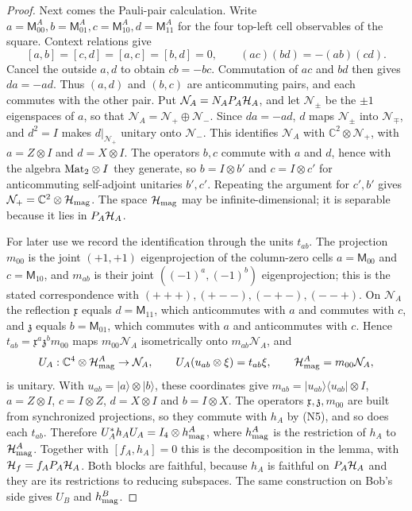 \begin{proof}
Next comes the Pauli-pair calculation. Write $a=\mathsf M^A_{00},b=\mathsf M^A_{01},c=\mathsf M^A_{10},d=\mathsf M^A_{11}$ for the four top-left cell observables of the square. Context relations give
\[
 [a,b]=[c,d]=[a,c]=[b,d]=0,\qquad
 (ac)(bd)=-(ab)(cd).
\]
Cancel the outside $a,d$ to obtain $cb=-bc$. Commutation of $ac$ and $bd$ then gives $da=-ad$. Thus $(a,d)$ and $(b,c)$ are anticommuting pairs, and each commutes with the other pair. Put $\mathcal N_A=N_AP_A\mathcal H_A$, and let $\mathcal N_\pm$ be the $\pm1$ eigenspaces of $a$, so that $\mathcal N_A=\mathcal N_+\oplus\mathcal N_-$. Since $da=-ad$, $d$ maps $\mathcal N_\pm$ into $\mathcal N_\mp$, and $d^2=I$ makes $d|_{\mathcal N_+}$ unitary onto $\mathcal N_-$. This identifies $\mathcal N_A$ with $\mathbb C^2\otimes\mathcal N_+$, with $a=Z\otimes I$ and $d=X\otimes I$. The operators $b,c$ commute with $a$ and $d$, hence with the algebra $\mathrm{Mat}_2\otimes I$ they generate, so $b=I\otimes b'$ and $c=I\otimes c'$ for anticommuting self-adjoint unitaries $b',c'$. Repeating the argument for $c',b'$ gives $\mathcal N_+=\mathbb C^2\otimes\mathcal H_{\rm mag}$. The space $\mathcal H_{\rm mag}$ may be infinite-dimensional; it is separable because it lies in $P_A\mathcal H_A$.

For later use we record the identification through the units $t_{ab}$. The projection $m_{00}$ is the joint $(+1,+1)$ eigenprojection of the column-zero cells $a=\mathsf M_{00}$ and $c=\mathsf M_{10}$, and $m_{ab}$ is their joint $((-1)^a,(-1)^b)$ eigenprojection; this is the stated correspondence with $(+++),(+--),(-+-),(--+)$. On $\mathcal N_A$ the reflection $\mathfrak x$ equals $d=\mathsf M_{11}$, which anticommutes with $a$ and commutes with $c$, and $\mathfrak z$ equals $b=\mathsf M_{01}$, which commutes with $a$ and anticommutes with $c$. Hence $t_{ab}=\mathfrak x^a\mathfrak z^bm_{00}$ maps $m_{00}\mathcal N_A$ isometrically onto $m_{ab}\mathcal N_A$, and
\[
 U_A:\mathbb C^4\otimes\mathcal H^A_{\rm mag}\to\mathcal N_A,\qquad
 U_A(u_{ab}\otimes\xi)=t_{ab}\xi,\qquad \mathcal H^A_{\rm mag}=m_{00}\mathcal N_A,
\]
is unitary. With $u_{ab}=|a\rangle\otimes|b\rangle$, these coordinates give $m_{ab}=|u_{ab}\rangle\langle u_{ab}|\otimes I$, $a=Z\otimes I$, $c=I\otimes Z$, $d=X\otimes I$ and $b=I\otimes X$. The operators $\mathfrak x,\mathfrak z,m_{00}$ are built from synchronized projections, so they commute with $h_A$ by (N5), and so does each $t_{ab}$. Therefore $U_A^*h_AU_A=I_4\otimes h^A_{\rm mag}$, where $h^A_{\rm mag}$ is the restriction of $h_A$ to $\mathcal H^A_{\rm mag}$. Together with $[f_A,h_A]=0$ this is the decomposition in the lemma, with $\mathcal H_f=f_AP_A\mathcal H_A$. Both blocks are faithful, because $h_A$ is faithful on $P_A\mathcal H_A$ and they are its restrictions to reducing subspaces. The same construction on Bob's side gives $U_B$ and $h^B_{\rm mag}$.


\end{proof}
